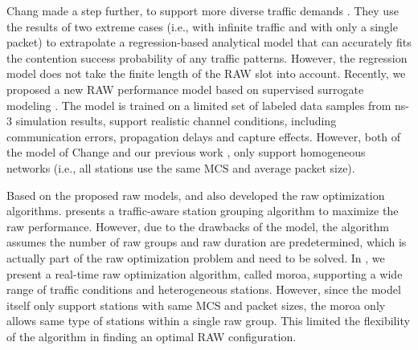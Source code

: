 Chang  made a step further, to support more diverse traffic demands \cite{Chang2018}. They use the results of two extreme cases (i.e., with infinite traffic and with only a single packet) to extrapolate a regression-based analytical model that can accurately fits the contention success probability of any traffic patterns. However, the regression model does not take the finite length of the RAW slot into account.
 Recently, we proposed a new RAW performance model based on supervised surrogate modeling \cite{wowmom2018}. The model is trained on a limited set of labeled data samples from ns-3 simulation results, support realistic channel conditions, including communication errors, propagation delays and capture effects. However, both of the model of Change \cite{Chang2018} and our previous work \cite{wowmom2018}, only support homogeneous networks (i.e., all stations use the same MCS and average packet size). 


Based on the proposed \gls{raw} models, \cite{Chang2018} and \cite{wowmom2018} also developed the \gls{raw} optimization algorithms.  \cite{Chang2018} presents a traffic-aware station grouping algorithm to maximize the \gls{raw} performance. However, due to the drawbacks of the model, the algorithm assumes the number of \gls{raw} groups and \gls{raw} duration are predetermined, which is actually part of the \gls{raw} optimization problem and need to be solved.
In \cite{wowmom2018}, we present a real-time \gls{raw} optimization algorithm, called \gls{moroa}, supporting a wide range of traffic conditions and heterogeneous stations. However, since the model itself only support stations with same MCS and  packet sizes, the \gls{moroa} only allows same type of stations within a single \gls{raw} group. This limited the flexibility of the algorithm in finding an optimal RAW configuration.






